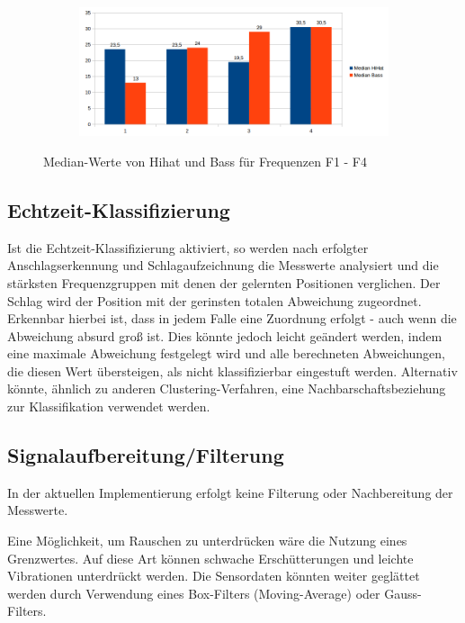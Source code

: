 \begin{figure}[H]
\centering
\begin{subfigure}{.5\textwidth}
		\includegraphics[scale=0.5]{figures/Median_hihatbass.png}
\end{subfigure}
\caption{Median-Werte  von Hihat und Bass für Frequenzen F1 - F4}
\label{fig:FFT}
\end{figure}


\subsection*{Echtzeit-Klassifizierung}
Ist die Echtzeit-Klassifizierung aktiviert, so werden nach erfolgter Anschlagserkennung und Schlagaufzeichnung die Messwerte analysiert und die stärksten Frequenzgruppen mit denen der gelernten Positionen verglichen. Der Schlag wird der Position mit der gerinsten totalen Abweichung zugeordnet.
Erkennbar hierbei ist, dass in jedem Falle eine Zuordnung erfolgt - auch wenn die Abweichung absurd groß ist. Dies könnte jedoch leicht geändert werden, indem eine maximale Abweichung festgelegt wird und alle berechneten Abweichungen, die diesen Wert übersteigen, als nicht klassifizierbar eingestuft werden. Alternativ könnte, ähnlich zu anderen Clustering-Verfahren, eine Nachbarschaftsbeziehung zur Klassifikation verwendet werden.

\subsection*{Signalaufbereitung/Filterung}

In der aktuellen Implementierung erfolgt keine Filterung oder Nachbereitung der Messwerte. 


Eine Möglichkeit, um Rauschen zu unterdrücken wäre die Nutzung eines Grenzwertes. Auf diese Art können schwache Erschütterungen und leichte Vibrationen unterdrückt werden.
Die Sensordaten könnten weiter geglättet werden durch Verwendung eines Box-Filters (Moving-Average) oder Gauss-Filters.

